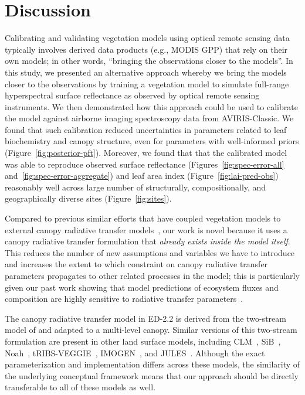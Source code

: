 \section{Discussion}

Calibrating and validating vegetation models using optical remote sensing data typically involves derived data products (e.g., MODIS GPP) that rely on their own models;
in other words, ``bringing the observations closer to the models''.
In this study, we presented an alternative approach whereby we bring the models closer to the observations by training a vegetation model to simulate full-range hyperspectral surface reflectance as observed by optical remote sensing instruments.
We then demonstrated how this approach could be used to calibrate the model against airborne imaging spectroscopy data from AVIRIS-Classic.
We found that such calibration reduced uncertainties in parameters related to leaf biochemistry and canopy structure, even for parameters with well-informed priors (Figure~\ref{fig:posterior-pft}).
Moreover, we found that that the calibrated model was able to reproduce observed surface reflectance (Figures~\ref{fig:spec-error-all} and~\ref{fig:spec-error-aggregate}) and leaf area index (Figure~\ref{fig:lai-pred-obs}) reasonably well across large number of structurally, compositionally, and geographically diverse sites (Figure~\ref{fig:sites}).

Compared to previous similar efforts that have coupled vegetation models to external canopy radiative transfer models~\citep{knorr2001assimilation, nouvellon2001coupling, quaife2008assimilating},
our work is novel because it uses a canopy radiative transfer formulation that \emph{already exists inside the model itself}.
This reduces the number of new assumptions and variables we have to introduce and increases the extent to which constraint on canopy radiative transfer parameters propagates to other related processes in the model;
this is particularly given our past work showing that model predictions of ecosystem fluxes and composition are highly sensitive to radiative transfer parameters~\citep{viskari_2019_influence}.

The canopy radiative transfer model in ED-2.2 is derived from the two-stream model of \citet{sellers1985canopy} and adapted to a multi-level canopy.
Similar versions of this two-stream formulation are present in other land surface models, including CLM~\citep{clm45_note}, SiB~\citep{baker2008seasonal}, Noah~\citep{niu2011community}, tRIBS-VEGGIE~\citep{ivanov2008vegetationhydrology}, IMOGEN~\citep{huntingford2008quantifying}, and JULES~\citep{best_2011_joint}.
Although the exact parameterization and implementation differs across these models, the similarity of the underlying conceptual framework means that our approach should be directly transferable to all of these models as well.

